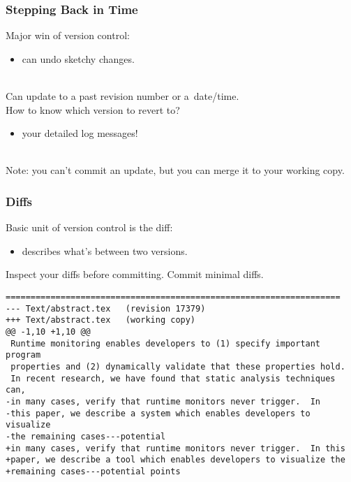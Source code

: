 \begin{frame}
\frametitle{Stepping Back in Time}

\Large
\begin{changemargin}{1cm}
Major win of version control:
\begin{itemize}
\item can undo sketchy changes.
\end{itemize}
~\\
Can update to a past revision number or a~date/time.\\[1em]

How to know which version to revert to?\\
\begin{itemize}
\item your detailed log messages!
\end{itemize}
~\\

Note: you can't commit an update, but you can merge it to your working
copy.
\end{changemargin}
\end{frame}

\begin{frame}[fragile]
\frametitle{Diffs}

\Large
\begin{changemargin}{1cm}
Basic unit of version control is the diff:

\begin{itemize}
\item describes what's  between two versions.
\end{itemize}

Inspect your diffs before committing. Commit minimal diffs.

{\tiny 
\hspace*{4em} 
\begin{verbatim}
===================================================================
--- Text/abstract.tex	(revision 17379)
+++ Text/abstract.tex	(working copy)
@@ -1,10 +1,10 @@
 Runtime monitoring enables developers to (1) specify important program
 properties and (2) dynamically validate that these properties hold.
 In recent research, we have found that static analysis techniques can,
-in many cases, verify that runtime monitors never trigger.  In
-this paper, we describe a system which enables developers to visualize
-the remaining cases---potential
+in many cases, verify that runtime monitors never trigger.  In this
+paper, we describe a tool which enables developers to visualize the
+remaining cases---potential points
\end{verbatim}
}
\end{changemargin}
\end{frame}


